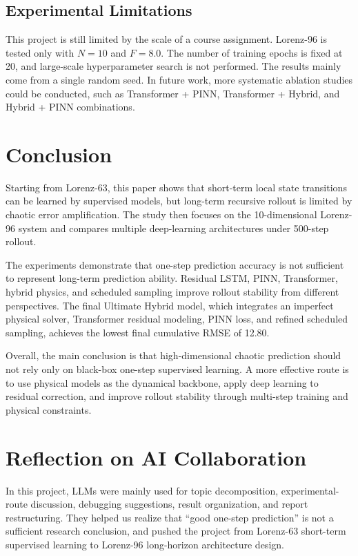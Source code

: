 \documentclass[a4paper,12pt]{article}
\begin{document}
\subsection{Experimental Limitations}

This project is still limited by the scale of a course assignment. Lorenz-96 is tested only with $N=10$ and $F=8.0$. The number of training epochs is fixed at 20, and large-scale hyperparameter search is not performed. The results mainly come from a single random seed. In future work, more systematic ablation studies could be conducted, such as Transformer + PINN, Transformer + Hybrid, and Hybrid + PINN combinations.

\section{Conclusion}

Starting from Lorenz-63, this paper shows that short-term local state transitions can be learned by supervised models, but long-term recursive rollout is limited by chaotic error amplification. The study then focuses on the 10-dimensional Lorenz-96 system and compares multiple deep-learning architectures under 500-step rollout.

The experiments demonstrate that one-step prediction accuracy is not sufficient to represent long-term prediction ability. Residual LSTM, PINN, Transformer, hybrid physics, and scheduled sampling improve rollout stability from different perspectives. The final Ultimate Hybrid model, which integrates an imperfect physical solver, Transformer residual modeling, PINN loss, and refined scheduled sampling, achieves the lowest final cumulative RMSE of 12.80.

Overall, the main conclusion is that high-dimensional chaotic prediction should not rely only on black-box one-step supervised learning. A more effective route is to use physical models as the dynamical backbone, apply deep learning to residual correction, and improve rollout stability through multi-step training and physical constraints.

\section{Reflection on AI Collaboration}

In this project, LLMs were mainly used for topic decomposition, experimental-route discussion, debugging suggestions, result organization, and report restructuring. They helped us realize that ``good one-step prediction'' is not a sufficient research conclusion, and pushed the project from Lorenz-63 short-term supervised learning to Lorenz-96 long-horizon architecture design.
\end{document}

